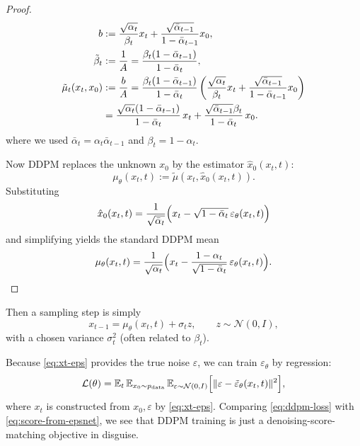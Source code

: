 \documentclass[../main]{subfiles}
\begin{document}
\begin{proof}
\begin{align}
    b &:= \frac{\sqrt{\alpha_t}}{\beta_t}x_t+\frac{\sqrt{\bar\alpha_{t-1}}}{1-\bar\alpha_{t-1}}x_0, \notag\\
    \tilde\beta_t &:= \frac{1}{A}=\frac{\beta_t(1-\bar\alpha_{t-1})}{1-\bar\alpha_t}, \notag\\
    \tilde\mu_t(x_t,x_0) &:= \frac{b}{A}
    = \frac{\beta_t(1-\bar\alpha_{t-1})}{1-\bar\alpha_t}
      \left(\frac{\sqrt{\alpha_t}}{\beta_t}x_t+\frac{\sqrt{\bar\alpha_{t-1}}}{1-\bar\alpha_{t-1}}x_0\right) \notag\\
    &= \frac{\sqrt{\alpha_t}(1-\bar\alpha_{t-1})}{1-\bar\alpha_t}\,x_t
     + \frac{\sqrt{\bar\alpha_{t-1}}\beta_t}{1-\bar\alpha_t}\,x_0.
\end{align}
where we used $\bar\alpha_t=\alpha_t\bar\alpha_{t-1}$ and $\beta_t=1-\alpha_t$.

Now DDPM replaces the unknown $x_0$ by the estimator $\hat x_0(x_t,t)$:
\begin{equation}
    \mu_\theta(x_t,t):=\tilde\mu(x_t,\hat x_0(x_t,t)).
\end{equation}
Substituting
\begin{equation}
    \hat x_0(x_t,t)=\frac{1}{\sqrt{\bar\alpha_t}}\Bigl(x_t-\sqrt{1-\bar\alpha_t}\,\varepsilon_\theta(x_t,t)\Bigr)
\end{equation}
and simplifying yields the standard DDPM mean
\begin{equation}
    \mu_\theta(x_t,t)
    =
    \frac{1}{\sqrt{\alpha_t}}
    \Bigl(x_t-\frac{1-\alpha_t}{\sqrt{1-\bar\alpha_t}}\,\varepsilon_\theta(x_t,t)\Bigr).
\end{equation}
\end{proof}
Then a sampling step is simply
\begin{equation}\label{eq:ddpm-sample-step}
    x_{t-1} = \mu_\theta(x_t,t) + \sigma_t z,\qquad z\sim\mathcal N(0,I),
\end{equation}
with a chosen variance $\sigma_t^2$ (often related to $\beta_t$).

Because \eqref{eq:xt-eps} provides the true noise $\varepsilon$, we can train $\varepsilon_\theta$ by regression:
\begin{equation}\label{eq:ddpm-loss}
    \mathcal L(\theta)=\mathbb E_{t}\,\mathbb E_{x_0\sim p_{\mathrm{data}}}\,
    \mathbb E_{\varepsilon\sim\mathcal N(0,I)}
    \Bigl[\|\varepsilon-\tilde\varepsilon_\theta(x_t,t)\|^2\Bigr],
\end{equation}
where $x_t$ is constructed from $x_0,\varepsilon$ by \eqref{eq:xt-eps}.
Comparing \eqref{eq:ddpm-loss} with \eqref{eq:score-from-epsnet}, we see that DDPM training is just
a denoising-score-matching objective in disguise.
\end{document}
